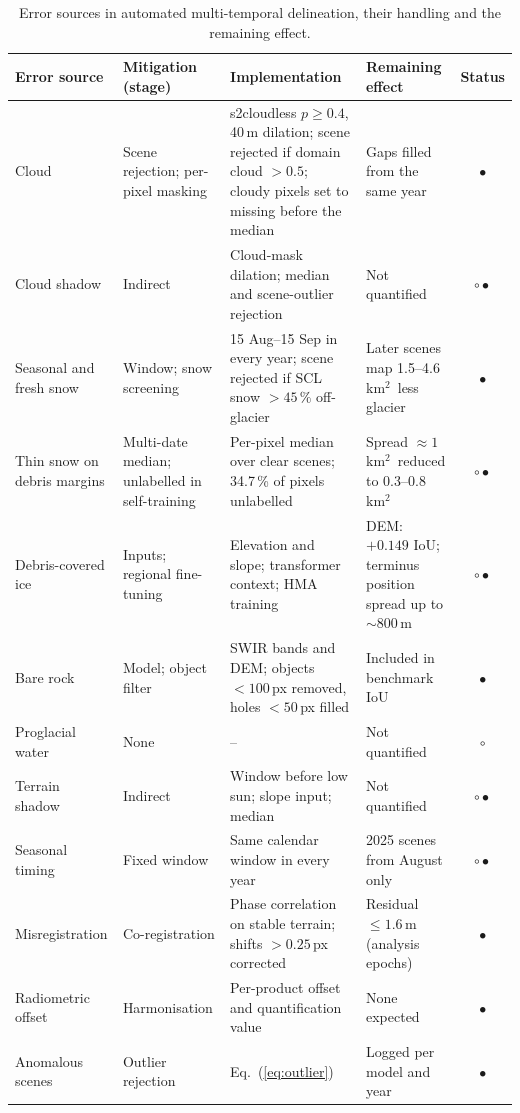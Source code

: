 \documentclass[pdflatex,sn-mathphys-num]{sn-jnl}%
\theoremstyle{thmstyleone}%
\theoremstyle{thmstyletwo}%
\theoremstyle{thmstylethree}%
\newcommand{\kmsq}{km$^2$}
\begin{document}
\begin{table}
\caption{Error sources in automated multi-temporal delineation, their handling and the remaining effect.}\label{tab:errors}
\begin{tabular*}{\textheight}{@{\extracolsep\fill}p{2.4cm}p{3.0cm}p{6.2cm}p{4.6cm}c}
\toprule
Error source & Mitigation (stage) & Implementation & Remaining effect & Status\footnotemark[1] \\
\midrule
Cloud & Scene rejection; per-pixel masking & s2cloudless $p \ge 0.4$, 40\,m dilation; scene rejected if domain cloud $> 0.5$; cloudy pixels set to missing before the median & Gaps filled from the same year & $\bullet$ \\
Cloud shadow & Indirect & Cloud-mask dilation; median and scene-outlier rejection & Not quantified & $\circ\!\bullet$ \\
Seasonal and fresh snow & Window; snow screening & 15 Aug--15 Sep in every year; scene rejected if SCL snow $> 45\,\%$ off-glacier & Later scenes map 1.5--4.6\,\kmsq\ less glacier & $\bullet$ \\
Thin snow on debris margins & Multi-date median; unlabelled in self-training & Per-pixel median over clear scenes; 34.7\,\% of pixels unlabelled & Spread $\approx 1$\,\kmsq\ reduced to 0.3--0.8\,\kmsq & $\circ\!\bullet$ \\
Debris-covered ice & Inputs; regional fine-tuning & Elevation and slope; transformer context; HMA training & DEM: $+0.149$ IoU; terminus position spread up to $\sim$800\,m & $\circ\!\bullet$ \\
Bare rock & Model; object filter & SWIR bands and DEM; objects $< 100$\,px removed, holes $< 50$\,px filled & Included in benchmark IoU & $\bullet$ \\
Proglacial water & None & -- & Not quantified & $\circ$ \\
Terrain shadow & Indirect & Window before low sun; slope input; median & Not quantified & $\circ\!\bullet$ \\
Seasonal timing & Fixed window & Same calendar window in every year & 2025 scenes from August only & $\circ\!\bullet$ \\
Misregistration & Co-registration & Phase correlation on stable terrain; shifts $> 0.25$\,px corrected & Residual $\le 1.6$\,m (analysis epochs) & $\bullet$ \\
Radiometric offset & Harmonisation & Per-product offset and quantification value & None expected & $\bullet$ \\
Anomalous scenes & Outlier rejection & Eq.~(\ref{eq:outlier}) & Logged per model and year & $\bullet$ \\

\end{tabular*}
\end{table}
\end{document}

